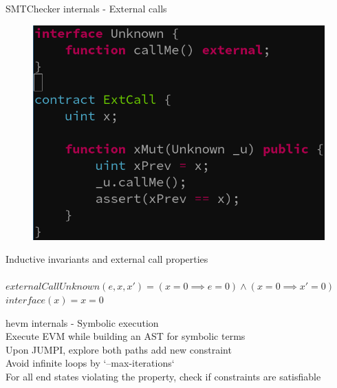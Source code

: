 \documentclass[aspectratio=169,10pt]{beamer}
\begin{document}
\begin{frame}[fragile]
\begin{center}
SMTChecker internals - External calls
\begin{figure}
	\includegraphics[scale=0.3]{images/extcall_pass_code}
\end{figure}
\end{center}
\end{frame}

\begin{frame}[fragile]
\begin{center}
Inductive invariants and external call properties\\
\;\\
$externalCallUnknown(e, x, x') = (x = 0 \implies e = 0) \land (x = 0 \implies x' = 0)$\\
$interface(x) = x = 0$
\end{center}
\end{frame}


\begin{frame}[fragile]
\begin{center}
hevm internals - Symbolic execution
\;\\
Execute EVM while building an AST for symbolic terms\\
Upon JUMPI, explore both paths add new constraint\\
Avoid infinite loops by `--max-iterations`\\
For all end states violating the property, check if constraints are satisfiable
\end{center}
\end{frame}
\end{document}
